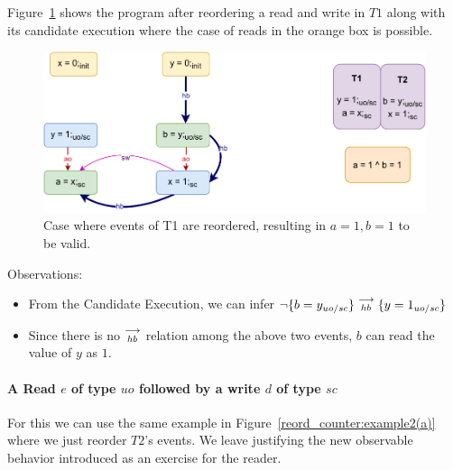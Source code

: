         Figure~\ref{reord_counter:example2(b)} shows the program after reordering a read and write in $T1$ along with its candidate execution where the case of reads in the orange box is possible. 
        \begin{figure}[H]
            \centering
            \includegraphics[scale=0.7]{5.InstructionReordering/4.ValidReorderingCandidate/Example3R(Rsc-Wuo,sc).pdf}
            \caption{Case where events of T1 are reordered, resulting in $a = 1, b = 1$ to be valid.}
            \label{reord_counter:example2(b)}
        \end{figure}
        
        Observations:
        \begin{itemize}
            \item From the Candidate Execution, we can infer $\neg\{b=y_{uo/sc}\}\stackrel{\longrightarrow}{_{hb}}\{y=1_{uo/sc}\}$
            \item Since there is no $\stackrel{\longrightarrow}{_{hb}}$ relation among the above two events, $b$ can read the value of $y$ as $1$.
        \end{itemize}

    \paragraph{A Read $e$ of type $uo$ followed by a write $d$ of type $sc$}

        For this we can use the same example in Figure~\ref{reord_counter:example2(a)} where we just reorder $T2$'s events.
        We leave justifying the new observable behavior introduced as an exercise for the reader.
    
        
